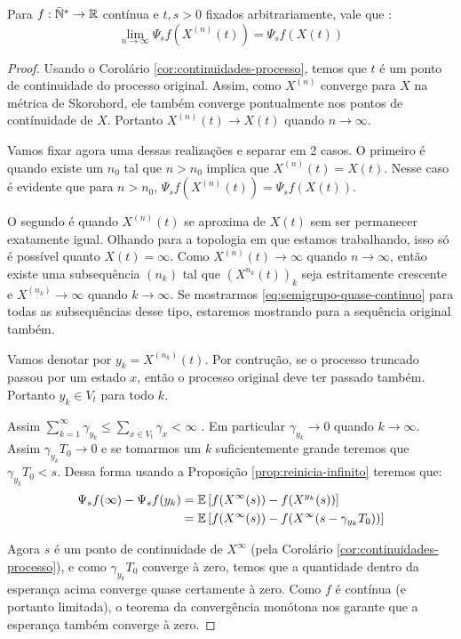 \begin{proposicao}
  \label{prop:semigrupo-quase-continuo}
  Para $f: {\mathbb{\bar{N}^*}} \to {\mathbb{R}}$ contínua e $t, s > 0$ fixados arbitrariamente,
  vale que \qc:
  \begin{equation}
    \label{eq:semigrupo-quase-continuo}
    \lim_{n \to \infty} \Psi_s f (X^{(n)}(t)) = \Psi_s f(X(t))
  \end{equation}
\end{proposicao}
\begin{proof}
  Usando o Corolário \ref{cor:continuidades-processo}, temos que $t$ é
  \qc um ponto de continuidade do processo original. Assim, como
  $X^{(n)}$ converge \qc para $X$ na métrica de Skorohord, ele também
  converge pontualmente nos pontos de contínuidade de $X$. Portanto
  $X^{(n)}(t) \to X(t)$ \qc quando $n \to \infty$.

  Vamos fixar agora uma dessas realizações e separar em 2 casos. O
  primeiro é quando existe um $n_0$ tal que $n > n_0$ implica que
  $X^{(n)}(t) = X(t)$. Nesse caso é evidente que para $n > n_0$,
  $\Psi_s f (X^{(n)}(t)) = \Psi_s f(X(t))$.

  O segundo é quando $X^{(n)}(t)$ se aproxima de $X(t)$ sem ser
  permanecer exatamente igual. Olhando para a topologia em que estamos
  trabalhando, isso só é possível quanto $X(t) = \infty$.  Como
  $X^{(n)}(t) \to \infty$ quando $n \to \infty$, então existe uma
  subsequência $(n_k)$ tal que $(X^{n_k}(t))_k$ seja estritamente
  crescente e $X^{(n_k)} \to \infty$ quando $k \to \infty$. Se
  mostrarmos \eqref{eq:semigrupo-quase-continuo} para todas as
  subsequências desse tipo, estaremos mostrando para a sequência
  original também.

  Vamos denotar por $y_k = X^{(n_k)}(t)$. Por contrução, se o processo
  truncado passou por um estado $x$, então o processo original deve
  ter passado também. Portanto $y_k \in V_t$ para todo $k$.

  Assim $\sum_{k = 1}^{\infty}\gamma_{y_k} \leq \sum_{x \in V_t}
  \gamma_x < \infty$ \qc. Em particular $\gamma_{y_k} \to 0$ quando
  $k\to\infty$. Assim $\gamma_{y_k} T_0 \to 0$ e se tomarmos um $k$
  suficientemente grande teremos que $\gamma_{y_k} T_0 < s$. Dessa
  forma usando a Proposição \ref{prop:reinicia-infinito} teremos que:
  \begin{align*}
    \Psi_s f (\infty) - \Psi_s f (y_k) &=
    {\mathbb{E}}\left[ f(X^\infty(s)) - f(X^{y_k}(s)) \right] \\
    &= {\mathbb{E}}\left[ f(X^\infty(s)) -f (X^\infty(s - \gamma_{y_k}T_0)) \right] \\
  \end{align*}

  Agora $s$ é \qc um ponto de continuidade de $X^\infty$ (pela
  Corolário \ref{cor:continuidades-processo}), e como $\gamma_{y_k}
  T_0$ converge à zero, temos que a quantidade dentro da esperança
  acima converge quase certamente à zero. Como $f$ é contínua (e
  portanto limitada), o teorema da convergência monótona nos garante
  que a esperança também converge à zero.
\end{proof}


